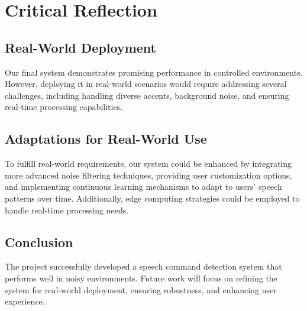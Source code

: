 \section{Critical Reflection}
\subsection{Real-World Deployment}
Our final system demonstrates promising performance in controlled environments. However, deploying it in real-world scenarios would require addressing several challenges, including handling diverse accents, background noise, and ensuring real-time processing capabilities.

\subsection{Adaptations for Real-World Use}
To fulfill real-world requirements, our system could be enhanced by integrating more advanced noise filtering techniques, providing user customization options, and implementing continuous learning mechanisms to adapt to users' speech patterns over time. Additionally, edge computing strategies could be employed to handle real-time processing needs.

\subsection{Conclusion}
The project successfully developed a speech command detection system that performs well in noisy environments. Future work will focus on refining the system for real-world deployment, ensuring robustness, and enhancing user experience.
